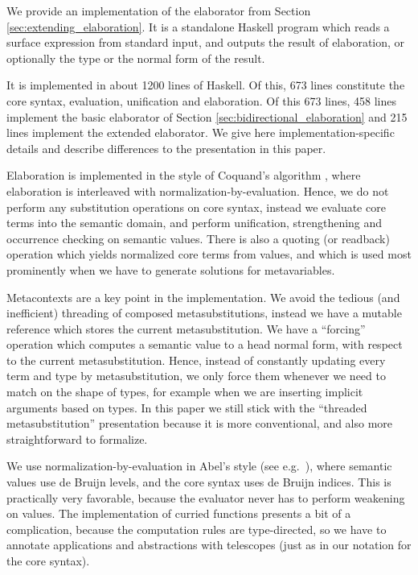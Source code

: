 \documentclass[acmsmall,review,anonymous,prologue,dvipsnames]{acmart}\settopmatter{printfolios=true,printccs=false,printacmref=false}
\theoremstyle{remark}
\begin{document}
We provide an implementation of the elaborator from Section
\ref{sec:extending_elaboration}. It is a standalone Haskell program which reads
a surface expression from standard input, and outputs the result of elaboration,
or optionally the type or the normal form of the result.


It is implemented in about 1200 lines of Haskell. Of this, 673 lines constitute
the core syntax, evaluation, unification and elaboration. Of this 673 lines, 458
lines implement the basic elaborator of Section
\ref{sec:bidirectional_elaboration} and 215 lines implement the extended
elaborator. We give here implementation-specific details and describe
differences to the presentation in this paper.

Elaboration is implemented in the style of Coquand's algorithm
\cite{coquand1996algorithm}, where elaboration is interleaved with
normalization-by-evaluation. Hence, we do not perform any substitution
operations on core syntax, instead we evaluate core terms into the semantic
domain, and perform unification, strengthening and occurrence checking on
semantic values. There is also a quoting (or readback) operation which yields
normalized core terms from values, and which is used most prominently when we
have to generate solutions for metavariables.

Metacontexts are a key point in the implementation. We avoid the tedious (and
inefficient) threading of composed metasubstitutions, instead we have a mutable
reference which stores the current metasubstitution. We have a ``forcing''
operation which computes a semantic value to a head normal form, with respect to
the current metasubstitution. Hence, instead of constantly updating every term
and type by metasubstitution, we only force them whenever we need to match on
the shape of types, for example when we are inserting implicit arguments based
on types. In this paper we still stick with the ``threaded metasubstitution''
presentation because it is more conventional, and also more straightforward to
formalize.

We use normalization-by-evaluation in Abel's style (see
e.g.\ \cite[Chapter~3]{abel2013normalization}), where semantic values use de
Bruijn levels, and the core syntax uses de Bruijn indices. This is practically
very favorable, because the evaluator never has to perform weakening on values.
The implementation of curried functions presents a bit of a complication,
because the computation rules are type-directed, so we have to annotate
applications and abstractions with telescopes (just as in our notation for the
core syntax).
\end{document}
